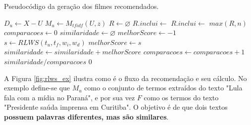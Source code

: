 \begin{algorithm}
	\caption{Pseudocódigo da geração dos filmes recomendados.}
    \begin{algorithmic}[1]
        	\State $D_u \gets X - U$
        	\State $M_u \gets M_{tfidf}(U, z)$
        	\State $R \gets \varnothing$
        			\State $R.inclui \gets$ 
				\Else
					\State $R.inclui \gets$ 
        		\EndIf
        	\EndFor
        	\Return $max(R, n)$
        \EndFunction\\
        	\State $comparacoes \gets 0$
        	\State $similaridade \gets \varnothing$
        		\State $melhorScore\gets -1$
        			\State $s \gets RLWS(t_u, t_f, w_i, w_d)$
        				\State $melhorScore \gets s$
        			\EndIf
        		\EndFor
        			\State $similaridade \gets similaridade + melhorScore$
        			\State $comparacoes \gets comparacoes + 1$
        		\EndIf
        	\EndFor
				\Return $similaridade / comparacoes$
			\Else
				\Return $0$
			\EndIf
        \EndFunction
    \end{algorithmic}
\label{alg:alg_recomendacao}
\end{algorithm}

A Figura \ref{fig:rlws_ex} ilustra como é o fluxo da recomendação e seu cálculo. No exemplo define-se que $M_u$ como o conjunto de termos extraídos do texto "Lula fala com a mídia no Paraná", e por sua vez $F$ como os termos do texto "Presidente saúda imprensa em Curitiba". O objetivo é de que dois textos \textbf{possuem palavras diferentes, mas são similares}.

